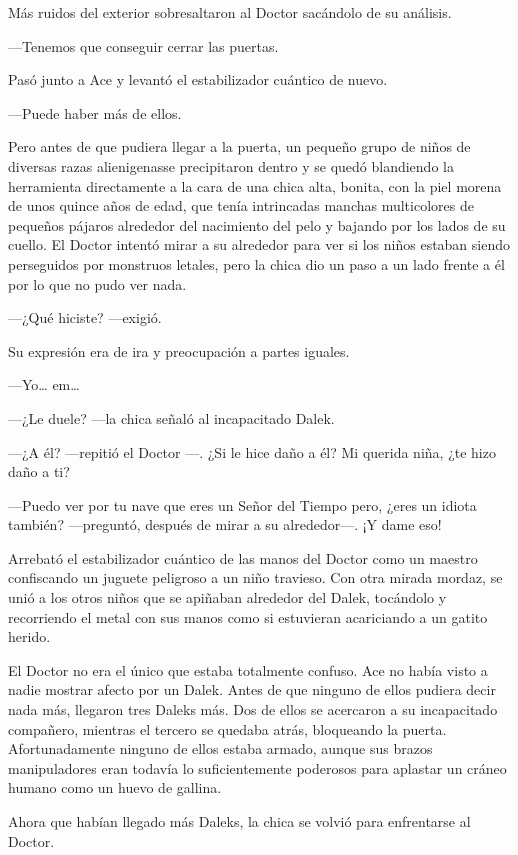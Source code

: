 Más ruidos del exterior sobresaltaron al Doctor sacándolo de su
análisis.

---Tenemos que conseguir cerrar las puertas.

Pasó junto a Ace y levantó el estabilizador cuántico de nuevo.

---Puede haber más de ellos.

Pero antes de que pudiera llegar a la puerta, un pequeño grupo
de niños de diversas razas alienigenasse precipitaron dentro y se quedó
blandiendo la herramienta directamente a la cara de una chica alta,
bonita, con la piel morena de unos quince años de edad, que tenía
intrincadas manchas multicolores de pequeños pájaros alrededor del
nacimiento del pelo y bajando por los lados de su cuello. El Doctor
intentó mirar a su alrededor para ver si los niños estaban siendo
perseguidos por monstruos letales, pero la chica dio un paso a un lado
frente a él por lo que no pudo ver nada.

---¿Qué hiciste? ---exigió.

Su expresión era de ira y preocupación a partes iguales.

---Yo\ldots{} em\ldots{}

---¿Le duele? ---la chica señaló al incapacitado Dalek.

---¿A él? ---repitió el Doctor ---. ¿Si le hice daño a él? Mi
querida niña, ¿te hizo daño a ti?

---Puedo ver por tu nave que eres un Señor del Tiempo pero,
¿eres un idiota también? ---preguntó, después de mirar a su
alrededor---. ¡Y dame eso!

Arrebató el estabilizador cuántico de las manos del Doctor como
un maestro confiscando un juguete peligroso a un niño travieso. Con otra
mirada mordaz, se unió a los otros niños que se apiñaban alrededor del
Dalek, tocándolo y recorriendo el metal con sus manos como si estuvieran
acariciando a un gatito herido.

El Doctor no era el único que estaba totalmente confuso. Ace no
había visto a nadie mostrar afecto por un Dalek. Antes de que ninguno de
ellos pudiera decir nada más, llegaron tres Daleks más. Dos de ellos se
acercaron a su incapacitado compañero, mientras el tercero se quedaba
atrás, bloqueando la puerta. Afortunadamente ninguno de ellos estaba
armado, aunque sus brazos manipuladores eran todavía lo suficientemente
poderosos para aplastar un cráneo humano como un huevo de gallina.

Ahora que habían llegado más Daleks, la chica se volvió para
enfrentarse al Doctor. 

